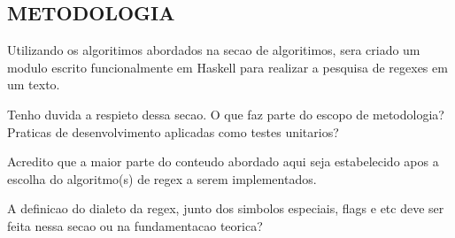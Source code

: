 \subsection{METODOLOGIA}

Utilizando os algoritimos abordados na secao de algoritimos, sera criado um modulo escrito funcionalmente em Haskell para realizar a pesquisa de regexes em um texto.

Tenho duvida a respieto dessa secao. O que faz parte do escopo de metodologia?
Praticas de desenvolvimento aplicadas como testes unitarios?

Acredito que a maior parte do conteudo abordado aqui seja estabelecido apos a escolha do algoritmo(s) de regex a serem implementados.

A definicao do dialeto da regex, junto dos simbolos especiais, flags e etc deve ser feita nessa secao ou na fundamentacao teorica?


